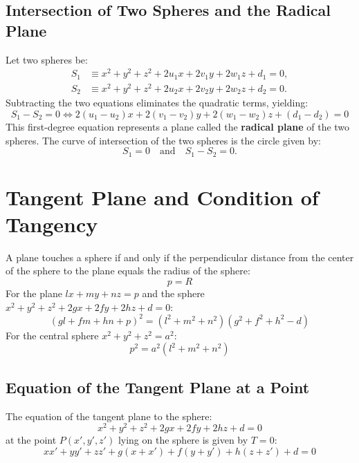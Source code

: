 \subsection{Intersection of Two Spheres and the Radical Plane}
Let two spheres be:
\begin{align}
    S_1 &\equiv x^2 + y^2 + z^2 + 2u_1 x + 2v_1 y + 2w_1 z + d_1 = 0, \\
    S_2 &\equiv x^2 + y^2 + z^2 + 2u_2 x + 2v_2 y + 2w_2 z + d_2 = 0.
\end{align}
Subtracting the two equations eliminates the quadratic terms, yielding:
\begin{equation}
    \boxed{S_1 - S_2 = 0 \iff 2(u_1 - u_2)x + 2(v_1 - v_2)y + 2(w_1 - w_2)z + (d_1 - d_2) = 0}
\end{equation}
This first-degree equation represents a plane called the \textbf{radical plane} of the two spheres.
The curve of intersection of the two spheres is the circle given by:
\begin{equation}
    S_1 = 0 \quad \text{and} \quad S_1 - S_2 = 0.
\end{equation}

\section{Tangent Plane and Condition of Tangency}

\begin{theorembox}
A plane touches a sphere if and only if the perpendicular distance from the center of the sphere to the plane equals the radius of the sphere:
\begin{equation}
    \boxed{p = R}
\end{equation}
For the plane $lx + my + nz = p$ and the sphere $x^2 + y^2 + z^2 + 2gx + 2fy + 2hz + d = 0$:
\begin{equation}
    \boxed{(gl + fm + hn + p)^2 = (l^2 + m^2 + n^2)(g^2 + f^2 + h^2 - d)}
\end{equation}
For the central sphere $x^2 + y^2 + z^2 = a^2$:
\begin{equation}
    \boxed{p^2 = a^2(l^2 + m^2 + n^2)}
\end{equation}
\end{theorembox}

\subsection{Equation of the Tangent Plane at a Point}
\begin{theorembox}
The equation of the tangent plane to the sphere:
\begin{equation}
    x^2 + y^2 + z^2 + 2gx + 2fy + 2hz + d = 0
\end{equation}
at the point $P(x', y', z')$ lying on the sphere is given by $T = 0$:
\begin{equation}
    \boxed{xx' + yy' + zz' + g(x + x') + f(y + y') + h(z + z') + d = 0}
\end{equation}
\end{theorembox}


